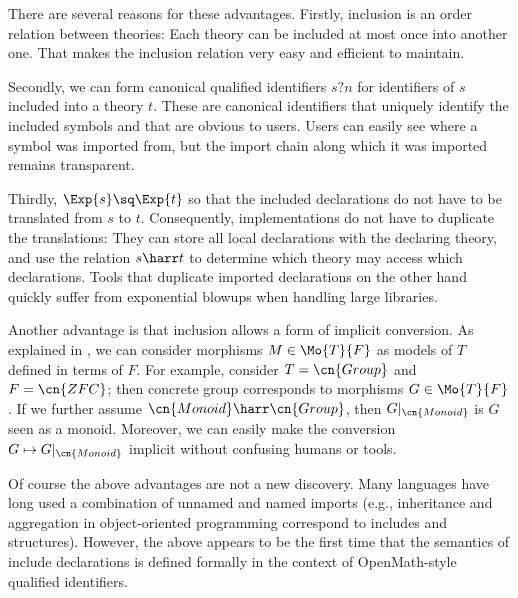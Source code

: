 There are several reasons for these advantages.
Firstly, inclusion is an order relation between theories: Each theory can be included at most once into another one.
That makes the inclusion relation very easy and efficient to maintain.

Secondly, we can form canonical qualified identifiers $s?n$ for identifiers of $s$ included into a theory $t$.
These are canonical identifiers that uniquely identify the included symbols and that are obvious to users.
Users can easily see where a symbol was imported from, but the import chain along which it was imported remains transparent.

Thirdly, $\Exp{s}\sq\Exp{t}$ so that the included declarations do not have to be translated from $s$ to $t$.
Consequently, implementations do not have to duplicate the translations: They can store all local declarations with the declaring theory, and use the relation $s\harr t$ to determine which theory may access which declarations.
Tools that duplicate imported declarations on the other hand quickly suffer from exponential blowups when handling large libraries.

Another advantage is that inclusion allows a form of implicit conversion.
As explained in \cite{RK:mmt:10}, we can consider morphisms $M\in\Mo{T}{F}$ as models of $T$ defined in terms of $F$.
For example, consider $T=\cn{Group}$ and $F=\cn{ZFC}$; then concrete group corresponds to morphisms $G\in\Mo{T}{F}$.
If we further assume $\cn{Monoid}\harr \cn{Group}$, then $G|_{\cn{Monoid}}$ is $G$ seen as a monoid.
Moreover, we can easily make the conversion $G\mapsto G|_{\cn{Monoid}}$ implicit without confusing humans or tools.
\medskip

Of course the above advantages are not a new discovery.
Many languages have long used a combination of unnamed and named imports (e.g., inheritance and aggregation in object-oriented programming correspond to includes and structures).
However, the above appears to be the first time that the semantics of include declarations is defined formally in the context of OpenMath-style qualified identifiers.

%
